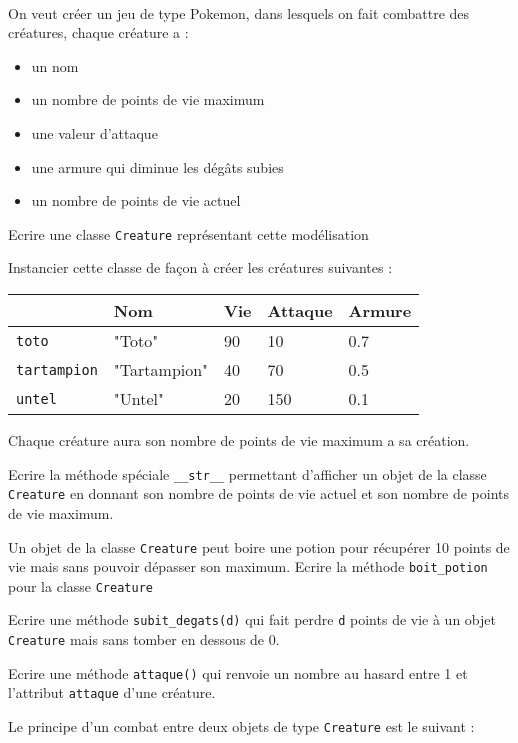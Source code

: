 \documentclass[11pt,a4paper]{article}
\begin{document}
 \\
On veut créer un jeu de type Pokemon, dans lesquels on fait combattre des créatures, chaque créature a :
\begin{itemize}
\item un nom
\item un nombre de points de vie maximum
\item une valeur d'attaque
\item une armure qui diminue les dégâts subies
\item un nombre de points de vie actuel
\end{itemize}
\QListe
\item Ecrire une classe {\tt Creature} représentant cette modélisation
\item Instancier cette classe de façon à créer les créatures suivantes :  
\begin{center}
\begin{tabularx}{0.7\textwidth}{|X|X|p{1.5cm}|p{1.5cm}|p{1.5cm}|}
        \cline{2-5}
        \multicolumn{1}{c|}{} & Nom & Vie & Attaque & Armure \\
        \hline
        {\tt toto} & "Toto" & 90 & 10 & 0.7 \\
        \hline
        {\tt tartampion} & "Tartampion" & 40 & 70 & 0.5 \\
        \hline
        {\tt untel} & "Untel" & 20 & 150 & 0.1   \\
        \hline
\end{tabularx}
\end{center}
Chaque créature aura son nombre de points de vie maximum a sa création.
\item Ecrire  la méthode spéciale {\tt \_\_str\_\_} permettant d'afficher un objet de la classe {\tt Creature} en donnant son nombre de points de vie actuel et son nombre de points de vie maximum.
\item Un objet de la classe {\tt Creature} peut boire une potion pour récupérer 10 points de vie mais sans pouvoir dépasser son maximum. Ecrire la méthode {\tt boit\_potion} pour la classe {\tt Creature}
\item Ecrire une méthode {\tt subit\_degats(d)} qui fait perdre {\tt d} points de vie à un objet {\tt Creature} mais sans tomber en dessous de 0.
\item Ecrire une méthode {\tt attaque()} qui renvoie un nombre au hasard entre 1 et l'attribut {\tt attaque} d'une créature.
\item Le principe d'un combat entre deux objets de type {\tt Creature} est le suivant :
\end{document}
